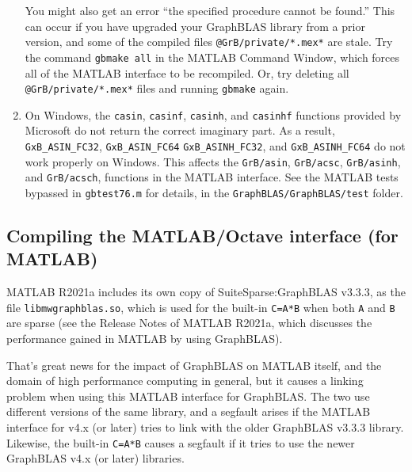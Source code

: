 \documentclass[12pt]{article}
\begin{document}
\begin{enumerate}
    You might also get an error ``the specified procedure cannot be found.''
    This can occur if you have upgraded your GraphBLAS library from a prior
    version, and some of the compiled files \verb'@GrB/private/*.mex*'
    are stale.  Try the command \verb'gbmake all' in the MATLAB Command
    Window, which forces all of the MATLAB interface to be recompiled.
    Or, try deleting all \verb'@GrB/private/*.mex*' files and running
    \verb'gbmake' again.

\item On Windows, the \verb'casin', \verb'casinf', \verb'casinh', and
    \verb'casinhf' functions provided by Microsoft do not return the correct
    imaginary part.  As a result, \verb'GxB_ASIN_FC32', \verb'GxB_ASIN_FC64'
    \verb'GxB_ASINH_FC32', and \verb'GxB_ASINH_FC64' do not work properly on
    Windows.  This affects the \verb'GrB/asin', \verb'GrB/acsc',
    \verb'GrB/asinh', and \verb'GrB/acsch', functions in the MATLAB interface.
    See the MATLAB tests bypassed in \verb'gbtest76.m' for details, in the
    \newline
    \verb'GraphBLAS/GraphBLAS/test' folder.

\end{enumerate}

\subsection{Compiling the MATLAB/Octave interface (for MATLAB)}
\label{R2021a}

MATLAB R2021a includes its own copy of SuiteSparse:GraphBLAS v3.3.3, as the
file \verb'libmwgraphblas.so', which is used for the built-in \verb'C=A*B' when
both \verb'A' and \verb'B' are sparse (see the Release Notes of MATLAB R2021a,
which discusses the performance gained in MATLAB by using GraphBLAS).

That's great news for the impact of GraphBLAS on MATLAB itself, and the domain
of high performance computing in general, but it causes a linking problem when
using this MATLAB interface for GraphBLAS.  The two use different versions of
the same library, and a segfault arises if the MATLAB interface for v4.x (or
later) tries to link with the older GraphBLAS v3.3.3 library.  Likewise, the
built-in \verb'C=A*B' causes a segfault if it tries to use the newer GraphBLAS
v4.x (or later) libraries.
\end{document}
